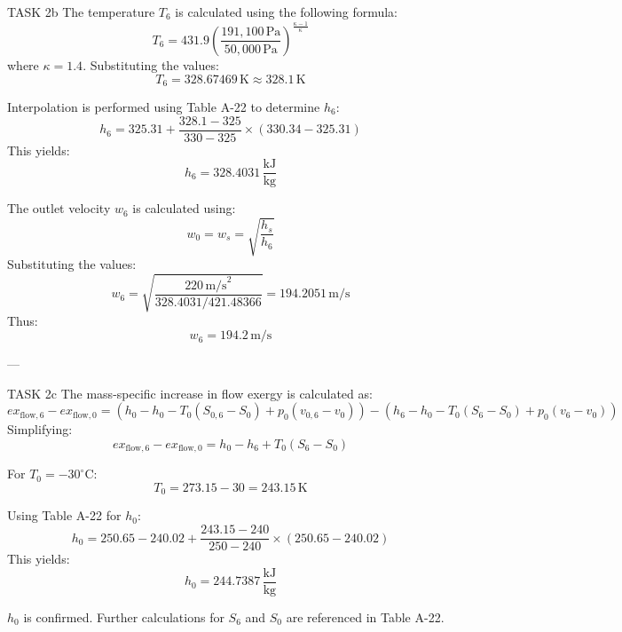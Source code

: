 TASK 2b  
The temperature \( T_6 \) is calculated using the following formula:  
\[
T_6 = 431.9 \left( \frac{191,100 \, \text{Pa}}{50,000 \, \text{Pa}} \right)^{\frac{\kappa - 1}{\kappa}}
\]  
where \( \kappa = 1.4 \). Substituting the values:  
\[
T_6 = 328.67469 \, \text{K} \approx 328.1 \, \text{K}
\]  

Interpolation is performed using Table A-22 to determine \( h_6 \):  
\[
h_6 = 325.31 + \frac{328.1 - 325}{330 - 325} \times (330.34 - 325.31)
\]  
This yields:  
\[
h_6 = 328.4031 \, \frac{\text{kJ}}{\text{kg}}
\]  

The outlet velocity \( w_6 \) is calculated using:  
\[
w_0 = w_s = \sqrt{\frac{h_s}{h_6}}
\]  
Substituting the values:  
\[
w_6 = \sqrt{\frac{220 \, \text{m/s}^2}{328.4031 / 421.48366}} = 194.2051 \, \text{m/s}
\]  
Thus:  
\[
w_6 = 194.2 \, \text{m/s}
\]  

---

TASK 2c  
The mass-specific increase in flow exergy is calculated as:  
\[
ex_{\text{flow},6} - ex_{\text{flow},0} = (h_0 - h_0 - T_0(S_{0,6} - S_0) + p_0(v_{0,6} - v_0)) - (h_6 - h_0 - T_0(S_{6} - S_0) + p_0(v_6 - v_0))
\]  
Simplifying:  
\[
ex_{\text{flow},6} - ex_{\text{flow},0} = h_0 - h_6 + T_0(S_6 - S_0)
\]  

For \( T_0 = -30^\circ\text{C} \):  
\[
T_0 = 273.15 - 30 = 243.15 \, \text{K}
\]  

Using Table A-22 for \( h_0 \):  
\[
h_0 = 250.65 - 240.02 + \frac{243.15 - 240}{250 - 240} \times (250.65 - 240.02)
\]  
This yields:  
\[
h_0 = 244.7387 \, \frac{\text{kJ}}{\text{kg}}
\]  

\( h_0 \) is confirmed. Further calculations for \( S_6 \) and \( S_0 \) are referenced in Table A-22.